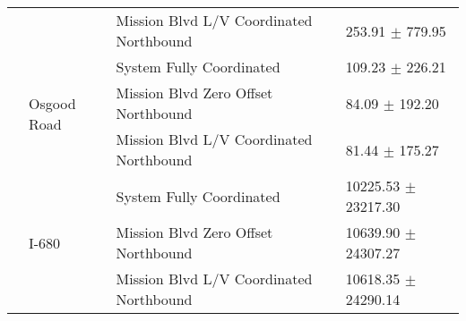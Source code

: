 \begin{tabular}{llll}
 &  & Mission Blvd L/V Coordinated Northbound & 253.91 $\pm$ 779.95 \\
 & \multirow[t]{3}{*}{Osgood Road} & System Fully Coordinated & 109.23 $\pm$ 226.21 \\
 &  & Mission Blvd Zero Offset Northbound & 84.09 $\pm$ 192.20 \\
 &  & Mission Blvd L/V Coordinated Northbound & 81.44 $\pm$ 175.27 \\
 & \multirow[t]{3}{*}{I-680} & System Fully Coordinated & 10225.53 $\pm$ 23217.30 \\
 &  & Mission Blvd Zero Offset Northbound & 10639.90 $\pm$ 24307.27 \\
 &  & Mission Blvd L/V Coordinated Northbound & 10618.35 $\pm$ 24290.14 \\
\bottomrule
\end{tabular}
